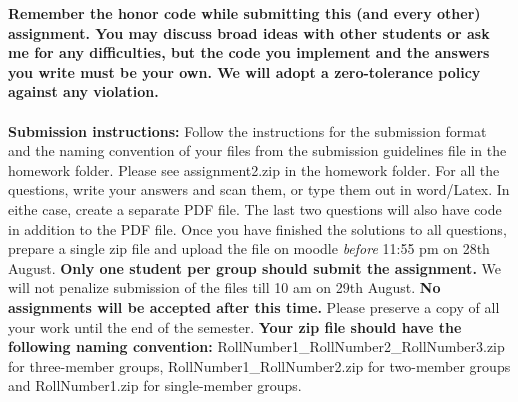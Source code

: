 \documentclass[11pt]{article}
\begin{document}
\maketitle

\textbf{Remember the honor code while submitting this (and every other) assignment. You may discuss broad ideas with other students or ask me for any difficulties, but the code you implement and the answers you write must be your own. We will adopt a \textbf{zero-tolerance policy} against any violation.}
\\
\\
\textbf{Submission instructions:} Follow the instructions for the submission format and the naming convention of your files from the submission guidelines file in the homework folder. Please see \textsf{assignment2.zip} in the homework folder. For all the questions, write your answers and scan them, or type them out in word/Latex. In eithe case, create a separate PDF file. The last two questions will also have code in addition to the PDF file. Once you have finished the solutions to all questions, prepare a single zip file and upload the file on moodle \emph{before} 11:55 pm on 28th August.  \textbf{Only one student per group should submit the assignment.} We will not penalize submission of the files till 10 am on 29th August. \textbf{No assignments will be accepted after this time.} Please preserve a copy of all your work until the end of the semester.  \textbf{Your zip file should have the following naming convention:} RollNumber1\_RollNumber2\_RollNumber3.zip for three-member groups, RollNumber1\_RollNumber2.zip for two-member groups and RollNumber1.zip for single-member groups. 
\end{document}
